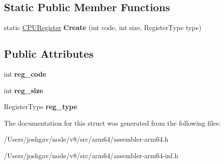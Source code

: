 \subsection*{Static Public Member Functions}
\begin{DoxyCompactItemize}
\item 
static \hyperlink{structv8_1_1internal_1_1_c_p_u_register}{C\+P\+U\+Register} {\bfseries Create} (int code, int size, Register\+Type type)\hypertarget{structv8_1_1internal_1_1_c_p_u_register_a543322a341f048618e140b9c6ab8a602}{}\label{structv8_1_1internal_1_1_c_p_u_register_a543322a341f048618e140b9c6ab8a602}

\end{DoxyCompactItemize}
\subsection*{Public Attributes}
\begin{DoxyCompactItemize}
\item 
int {\bfseries reg\+\_\+code}\hypertarget{structv8_1_1internal_1_1_c_p_u_register_abee43406836e83d8dc6881c6f8c0a984}{}\label{structv8_1_1internal_1_1_c_p_u_register_abee43406836e83d8dc6881c6f8c0a984}

\item 
int {\bfseries reg\+\_\+size}\hypertarget{structv8_1_1internal_1_1_c_p_u_register_acf149b3ee436513d0b24aab3c879ea1f}{}\label{structv8_1_1internal_1_1_c_p_u_register_acf149b3ee436513d0b24aab3c879ea1f}

\item 
Register\+Type {\bfseries reg\+\_\+type}\hypertarget{structv8_1_1internal_1_1_c_p_u_register_acae4a986b0654f95c5eabab3638491e3}{}\label{structv8_1_1internal_1_1_c_p_u_register_acae4a986b0654f95c5eabab3638491e3}

\end{DoxyCompactItemize}


The documentation for this struct was generated from the following files\+:\begin{DoxyCompactItemize}
\item 
/\+Users/joshgav/node/v8/src/arm64/assembler-\/arm64.\+h\item 
/\+Users/joshgav/node/v8/src/arm64/assembler-\/arm64-\/inl.\+h\end{DoxyCompactItemize}
